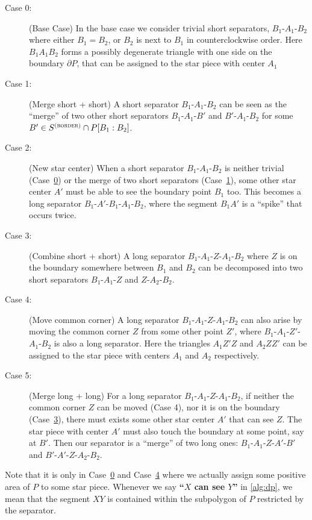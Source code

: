 \documentclass{theoretics}
\newcommand\Sbor{S^{\textsc{(border)}}}
\begin{document}
\newcommand\DPCase[1]{Case~\hyperref[itm:case#1]{#1}}

\begin{description}
 \item[Case 0:\label{itm:case0}] (Base Case) In the base case we consider trivial short separators, $B_1$-$A_1$-$B_2$ where either $B_1 = B_2$, or $B_2$ is next to $B_1$ in counterclockwise order. 
 Here $B_1 A_1 B_2$ forms a possibly degenerate triangle with one side on the boundary $\partial P$, that can be assigned to the star piece with center $A_1$
 \item[Case 1:\label{itm:case1}] (Merge short + short) A short separator $B_1$-$A_1$-$B_2$ can be seen as the ``merge'' of two other short separators $B_1$-$A_1$-$B'$ and $B'$-$A_1$-$B_2$ for some $B'\in \Sbor \cap P[B_1:B_2]$.
 \item[Case 2:\label{itm:case2}] (New star center) When a short separator $B_1$-$A_1$-$B_2$ is neither trivial (\DPCase{0}) or the merge of two short separators (\DPCase{1}), some other star center $A'$ must be able to see the boundary point $B_1$ too. This becomes a long separator $B_1$-$A'$-$B_1$-$A_1$-$B_2$, where the segment $B_1A'$ is a ``spike'' that occurs twice.
 \item[Case 3:\label{itm:case3}] (Combine short + short) A long separator $B_1$-$A_1$-$Z$-$A_1$-$B_2$ where $Z$ is on the boundary somewhere between $B_1$ and $B_2$ can be decomposed into two short separators $B_1$-$A_1$-$Z$ and $Z$-$A_2$-$B_2$.
 \item[Case 4:\label{itm:case4}] (Move common corner) A long separator $B_1$-$A_1$-$Z$-$A_1$-$B_2$ can also arise by moving the common corner $Z$ from some other point $Z'$, where $B_1$-$A_1$-$Z'$-$A_1$-$B_2$  is also a long separator. Here the triangles $A_1 Z' Z$ and $A_2ZZ'$ can be assigned to the star piece with centers $A_1$ and $A_2$ respectively.
 \item[Case 5:\label{itm:case5}] (Merge long + long) For a long separator $B_1$-$A_1$-$Z$-$A_1$-$B_2$, if neither the common corner $Z$ can be moved (Case 4), nor it is on the boundary (\DPCase{3}), there must exists some other star center $A'$ that can see $Z$. The star piece with center $A'$ must also touch the boundary at some point, say at $B'$. Then 
 our separator is a ``merge'' of two long ones: 
 $B_1$-$A_1$-$Z$-$A'$-$B'$
 and  $B'$-$A'$-$Z$-$A_2$-$B_2$.
\end{description}
Note that it is only in \DPCase{0} and \DPCase{4} where we actually assign some positive area of $P$ to some star piece.
Whenever we say \textbf{``$X$ can see $Y$''} in \cref{alg:dp}, we mean that the segment $XY$ is contained within the subpolygon of $P$ restricted by the separator.
\end{document}
